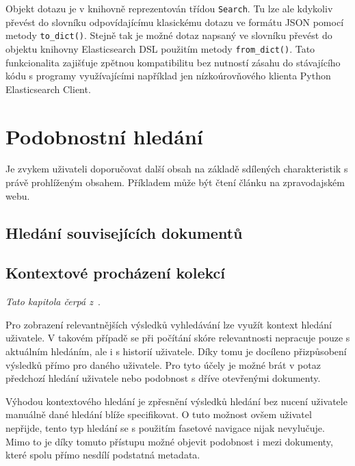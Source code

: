 Objekt dotazu je v knihovně reprezentován třídou \texttt{Search}. Tu lze ale kdykoliv převést do slovníku odpovídajícímu klasickému dotazu ve formátu JSON pomocí metody \texttt{to\_dict()}. Stejně tak je možné dotaz napsaný ve slovníku převést do objektu knihovny Elasticsearch DSL použitím metody \texttt{from\_dict()}. Tato funkcionalita zajišťuje zpětnou kompatibilitu bez nutností zásahu do stávajícího kódu s programy využívajícími například jen nízkoúrovňového klienta Python Elasticsearch Client.



\section{Podobnostní hledání}
Je zvykem uživateli doporučovat další obsah na základě sdílených charakteristik s právě prohlíženým obsahem. Příkladem může být čtení článku na zpravodajském webu.
\blindtext

\subsection{Hledání souvisejících dokumentů}
\blindtext[2]

\subsection{Kontextové procházení kolekcí}
\emph{Tato kapitola čerpá z~\cite{bib:similarity-context}}.



Pro zobrazení relevantnějších výsledků vyhledávání lze využít kontext hledání uživatele. V takovém případě se při počítání skóre relevantnosti nepracuje pouze s aktuálním hledáním, ale i s historií uživatele. Díky tomu je docíleno přizpůsobení výsledků přímo pro daného uživatele.
Pro tyto účely je možné brát v potaz předchozí hledání uživatele nebo podobnost s dříve otevřenými dokumenty.

Výhodou kontextového hledání je zpřesnění výsledků hledání bez nucení uživatele manuálně dané hledání blíže specifikovat. O tuto možnost ovšem uživatel nepřijde, tento typ hledání se s použitím fasetové navigace nijak nevylučuje. 
Mimo to je díky tomuto přístupu možné objevit podobnost i mezi dokumenty, které spolu přímo nesdílí podstatná metadata. 



